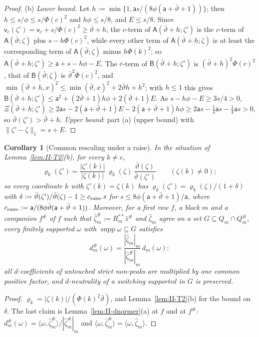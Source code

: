 \documentclass[10pt]{amsart}
\newtheorem{corollary}[theorem]{Corollary}
\theoremstyle{definition}
\theoremstyle{remark}
\newcommand{\supp}{\operatorname{supp}}
\newcommand{\zh}{\hat z}
\newcommand{\ip}[2]{\langle #1,#2\rangle}
\begin{document}
\begin{proof}
(b) \emph{Lower bound.}  Let $h:=\min\{1,\mathsf as/(8\phi(\mathsf
a+\bar\vartheta+1))\}$; then $h\le s/\phi\le s/\Phi(c)^2$ and $h\phi\le s/8$,
and $E\le s/8$.  Since $\mathsf v_c(\zeta')=\mathsf v_c+s/\Phi(c)^2\ge
\bar\vartheta+h$, the $c$-term of $\mathsf A(\bar\vartheta+h;\zeta')$ is the
$c$-term of $\mathsf A(\bar\vartheta;\zeta)$ plus $s-h\Phi(c)^2$, while every
other term of $\mathsf A(\bar\vartheta+h;\zeta)$ is at least the
corresponding term of $\mathsf A(\bar\vartheta;\zeta)$ minus $h\Phi(k)^2$;
so $\mathsf A(\bar\vartheta+h;\zeta')\ge\mathsf a+s-h\phi-E$.  The $c$-term of
$\mathsf B(\bar\vartheta+h;\zeta')$ is $(\bar\vartheta+h)^2\Phi(c)^2$, that of
$\mathsf B(\bar\vartheta;\zeta)$ is $\bar\vartheta^2\Phi(c)^2$, and
$\min(\bar\vartheta+h,x)^2\le\min(\bar\vartheta,x)^2+2\bar\vartheta h+h^2$; with
$h\le1$ this gives $\mathsf B(\bar\vartheta+h;\zeta')\le\mathsf
a^2+(2\bar\vartheta+1)h\phi+2(\bar\vartheta+1)E$.  As $s-h\phi-E\ge3s/4>0$,
\[
 \Xi(\bar\vartheta+h;\zeta')\ge2\mathsf as-2(\mathsf a+\bar\vartheta+1)E
 -2(\mathsf a+\bar\vartheta+1)h\phi\ge2\mathsf as-\tfrac14\mathsf as-
 \tfrac14\mathsf as>0,
\]
so $\bar\vartheta(\zeta')>\bar\vartheta+h$.  \emph{Upper bound}: part (a)
(upper bound) with $\|\zeta'-\zeta\|_1=s+E$.
\end{proof}

\begin{corollary}[Common rescaling under a raise]\label{cor:II-T3}
In the situation of Lemma~\textup{\ref{lem:II-T2}(b)}, for every $k\ne c$,
\[
 \varrho_k(\zeta')=\frac{|\zeta'(k)|}{|\zeta(k)|}\,\varrho_k(\zeta)\,
 \frac{\bar\vartheta(\zeta)}{\bar\vartheta(\zeta')}\qquad(\zeta(k)\ne0);
\]
so every coordinate $k$ with $\zeta'(k)=\zeta(k)$ has
$\varrho_k(\zeta')=\varrho_k(\zeta)/(1+\delta)$ with
$\delta:=\bar\vartheta(\zeta')/\bar\vartheta(\zeta)-1\ge c_{\rm raise}\,s$ for
$s\le8\phi(\mathsf a+\bar\vartheta+1)/\mathsf a$, where $c_{\rm raise}:=
\mathsf a/(8\phi\bar\vartheta(\mathsf a+\bar\vartheta+1))$.  Moreover, for a
first row $f$, a block $m$ and a companion $f^\#$ of $f$ such that
$\hat\zeta^\#_m:=R_m^{**}\zh^\#$ and $\hat\zeta_m$ agree on a set $G\subseteq
Q_m\cap Q^\#_m$, every finitely supported $\omega$ with $\supp\omega\subseteq
G$ satisfies
\[
 d^\#_m(\omega)=\frac{|\hat\zeta_m|_m}{|\hat\zeta^\#_m|_m}\,d_m(\omega):
\]
all $d$-coefficients of untouched strict non-peaks are multiplied by one
common positive factor, and $d$-neutrality of a switching supported in $G$
is preserved.
\end{corollary}

\begin{proof}
$\varrho_k=|\zeta(k)|/(\Phi(k)^2\bar\vartheta)$, and Lemma~\ref{lem:II-T2}(b)
for the bound on $\delta$.  The last claim is Lemma~\ref{lem:II-dnormer}(a)
at $f$ and at $f^\#$: $d^\#_m(\omega)=\ip{\omega}{\hat\zeta^\#_m}/
|\hat\zeta^\#_m|_m$ and $\ip{\omega}{\hat\zeta^\#_m}=\ip{\omega}{\hat\zeta_m}$.
\end{proof}
\end{document}

